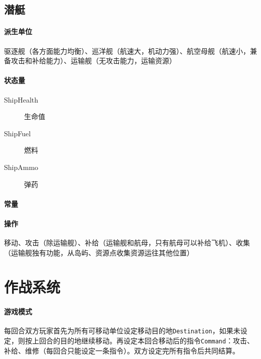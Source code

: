 \documentclass[11pt,a4paper]{article}
\begin{document}
    \subsection{潜艇}
      \paragraph{派生单位}
        驱逐舰（各方面能力均衡）、巡洋舰（航速大，机动力强）、航空母舰（航速小，兼备攻击和补给能力）、运输舰（无攻击能力，运输资源）
      \paragraph{状态量}
        \begin{minipage}[t]{0.6\textwidth}
          \begin{description}
            \item[ShipHealth] 生命值
            \item[ShipFuel] 燃料
            \item[ShipAmmo] 弹药
          \end{description}
        \end{minipage}

      \paragraph{常量}
        \begin{minipage}[t]{0.6\textwidth}
          \begin{description}
            \item[ ]  
          \end{description}
        \end{minipage}

      \paragraph{操作} 移动、攻击（除运输舰）、补给（运输舰和航母，只有航母可以补给飞机）、收集（运输舰独有功能，从岛屿、资源点收集资源运往其他位置）


  \section{作战系统}
  \label{sec:作战系统}
      \paragraph{游戏模式}
        每回合双方玩家首先为所有可移动单位设定移动目的地\texttt{Destination}，如果未设定，则按上回合的目的地继续移动。再设定本回合移动后的指令\texttt{Command}：攻击、补给、维修（每回合只能设定一条指令）。双方设定完所有指令后共同结算。
\end{document}
